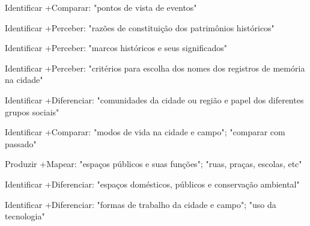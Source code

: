  Identificar +Comparar: "pontos de vista de eventos"

 Identificar +Perceber: "razões de constituição dos patrimônios históricos"

 Identificar +Perceber: "marcos históricos e seus significados"

 Identificar +Perceber: "critérios para escolha dos nomes dos registros de memória na cidade"

 Identificar +Diferenciar: "comunidades da cidade ou região e papel dos diferentes grupos sociais"

 Identificar +Comparar: "modos de vida na cidade e campo"; "comparar com passado"

 Produzir +Mapear: "espaços públicos e suas funções"; "ruas, praças, escolas, etc"

 Identificar +Diferenciar: "espaços domésticos, públicos e conservação ambiental"

 Identificar +Diferenciar: "formas de trabalho da cidade e campo"; "uso da tecnologia"

